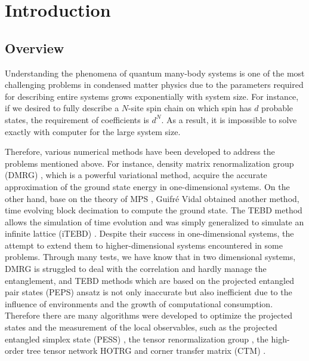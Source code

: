 \chapter{Introduction}
\label{chapter:Introduction}

\section{Overview}
\label{overview}

Understanding the phenomena of quantum many-body systems is one of the most challenging problems in condensed matter physics due to the parameters required for describing entire systems grows exponentially with system size. For instance, if we desired to fully describe a $N$-site spin chain on which spin has $d$ probable states, the requirement of coefficients is $d^N$. As a result, it is impossible to solve exactly with computer for the large system size.

Therefore, various numerical methods have been developed to address the problems mentioned above. For instance, density matrix renormalization group (DMRG) \cite{PhysRevLett.69.2863, PhysRevB.48.10345}, which is a powerful variational method, acquire the accurate approximation of the ground state energy in one-dimensional systems. On the other hand, base on the theory of MPS \cite{PhysRevB.73.094423, PhysRevLett.75.3537}, Guifr\'e Vidal obtained another method, time evolving block decimation to compute the ground state. The TEBD \cite{PhysRevLett.91.147902, PhysRevLett.93.040502} method allows the simulation of time evolution and was simply generalized to simulate an infinite lattice (iTEBD) \cite{PhysRevLett.98.070201, PhysRevB.78.155117}. 
Despite their success in one-dimensional systems, the attempt to extend them to higher-dimensional systems encountered in some problems. Through many tests, we have know that in two dimensional systems, DMRG is struggled to deal with the correlation and hardly manage the entanglement, and TEBD methods which are based on the projected entangled pair states (PEPS) \cite{PhysRevA.75.033605, jordan_studies_2011} ansatz is not only inaccurate but also inefficient due to the influence of environments and the growth of computational consumption. Therefore there are many algorithms were developed to optimize the projected states and the measurement of the local observables, such as the projected entangled simplex state (PESS) \cite{PhysRevX.4.011025}, the tensor renormalization group \cite{PhysRevLett.99.120601,PhysRevB.78.205116,PhysRevB.80.155131}, the high-order tree tensor network HOTRG \cite{PhysRevB.86.045139} and corner transfer matrix (CTM) \cite{doi:10.1143/JPSJ.65.891,PhysRevB.80.094403}.

